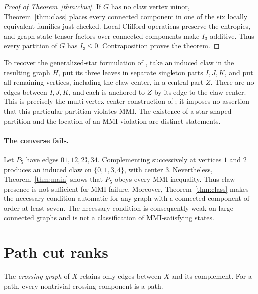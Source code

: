 \documentclass[11pt,letterpaper]{article}
\newcommand{\Ithree}{I_3}
\begin{document}
\begin{proof}[Proof of Theorem~\ref{thm:claw}]
If $G$ has no claw vertex minor, Theorem~\ref{thm:class} places every connected component in one of the six locally equivalent families just checked. Local Clifford operations preserve the entropies, and graph-state tensor factors over connected components make $\Ithree$ additive. Thus every partition of $G$ has $\Ithree\leq0$. Contraposition proves the theorem.
\end{proof}

To recover the generalized-star formulation of \cite[Conjecture~1]{FKMP}, take an induced claw in the resulting graph $H$, put its three leaves in separate singleton parts $I,J,K$, and put all remaining vertices, including the claw center, in a central part $Z$. There are no edges between $I,J,K$, and each is anchored to $Z$ by its edge to the claw center. This is precisely the multi-vertex-center construction of \cite[Section~4.2]{FKMP}; it imposes no assertion that this particular partition violates MMI. The existence of a star-shaped partition and the location of an MMI violation are distinct statements.

\paragraph{The converse fails.}
Let $P_5$ have edges $01,12,23,34$. Complementing successively at vertices $1$ and $2$ produces an induced claw on $\{0,1,3,4\}$, with center $3$. Nevertheless, Theorem~\ref{thm:main} shows that $P_5$ obeys every MMI inequality. Thus claw presence is not sufficient for MMI failure. Moreover, Theorem~\ref{thm:class} makes the necessary condition automatic for any graph with a connected component of order at least seven. The necessary condition is consequently weak on large connected graphs and is not a classification of MMI-satisfying states.

\section{Path cut ranks}
The \emph{crossing graph} of $X$ retains only edges between $X$ and its complement. For a path, every nontrivial crossing component is a path.
\end{document}
